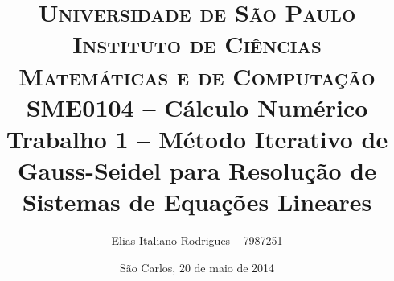 \begin{titlepage}

		\title{
\textsc {\large Universidade de São Paulo\\
Instituto de Ciências Matemáticas e de Computação}\\[1cm]
{\large SME0104 -- Cálculo Numérico}\\[5cm]
{\LARGE Trabalho 1 -- Método Iterativo de Gauss-Seidel para Resolução de Sistemas de Equações Lineares}\\[4cm]
		}

		\author{
Elias Italiano Rodrigues -- 7987251
		}

		\date{
\vfill São Carlos, 20 de maio de 2014
		}
	
		\maketitle
		\thispagestyle{empty}

\end{titlepage}
